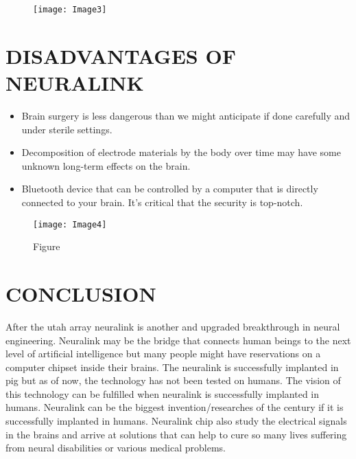 \documentclass[12pt]{article}
\begin{document}
\begin{figure}
\centering
\texttt{[image: Image3]}
\caption{}
\end{figure}

\clearpage

\section{DISADVANTAGES OF NEURALINK}
\begin{itemize}

\item Brain surgery is less dangerous than we might anticipate if done carefully and under sterile settings.
\item Decomposition of electrode materials by the body over time may have some unknown long-term effects on the brain.
\item Bluetooth device that can be controlled by a computer that is directly connected to your brain. It's critical that the security is top-notch.
\end{itemize}
\begin{figure}
\centering
\texttt{[image: Image4]}
\caption{Figure}
\end{figure}

\section{CONCLUSION}

After the utah array neuralink is another and upgraded breakthrough in neural engineering. Neuralink may be the bridge that connects human beings to the next level of artificial intelligence but many people might have reservations on a computer chipset inside their brains. The neuralink is successfully implanted in pig but as of now, the technology has not been tested on humans. The vision of this technology can be fulfilled when neuralink is successfully implanted in humans. Neuralink can be the biggest invention/researches of the century if it is successfully implanted in humans. Neuralink chip also study the electrical signals in the brains and arrive at solutions that can help to cure so many lives suffering from neural disabilities or various medical problems.
\end{document}
